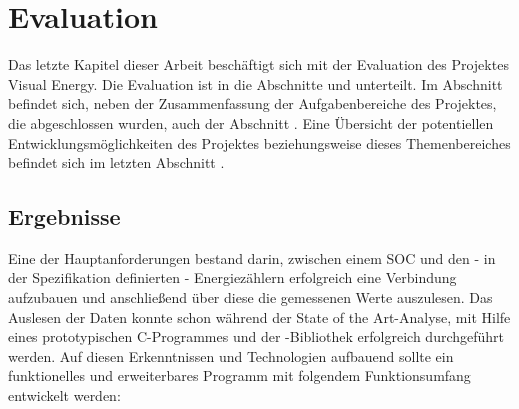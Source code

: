 \documentclass[Bachelorarbeit.tex]{subfiles}
\begin{document}
\chapter{Evaluation}
Das letzte Kapitel dieser Arbeit beschäftigt sich mit der Evaluation des Projektes Visual Energy. Die Evaluation ist in die Abschnitte \textbf{} und \textbf{} unterteilt. 
Im Abschnitt \textbf{} befindet sich, neben der Zusammenfassung der Aufgabenbereiche des Projektes, die abgeschlossen wurden, auch der Abschnitt \textbf{}.
Eine Übersicht der potentiellen Entwicklungsmöglichkeiten des Projektes beziehungsweise dieses Themenbereiches befindet sich im letzten Abschnitt \textbf{}.

\section{Ergebnisse}
\label{sec:ergebnisse}

Eine der Hauptanforderungen bestand darin, zwischen einem \ac{SOC} und den - in der Spezifikation definierten - Energiezählern erfolgreich eine Verbindung aufzubauen und anschließend über diese die gemessenen Werte auszulesen. 
Das Auslesen der Daten konnte schon während der State of the Art-Analyse, mit Hilfe eines prototypischen C-Programmes und der -Bibliothek erfolgreich durchgeführt werden. 
Auf diesen Erkenntnissen und Technologien aufbauend sollte ein funktionelles und erweiterbares Programm mit folgendem Funktionsumfang entwickelt werden:
\end{document}
